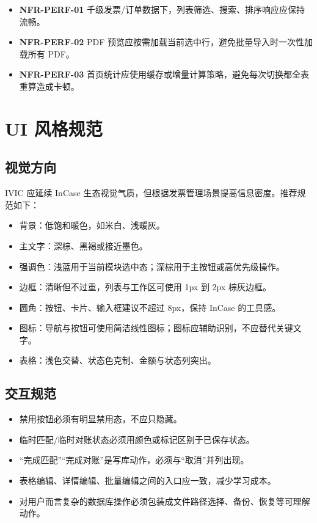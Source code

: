 \documentclass[UTF8,zihao=-4]{ctexart}
\newcommand{\req}[1]{\textbf{\textcolor{ivicBrown}{#1}}}
\begin{document}
\begin{itemize}
  \item \req{NFR-PERF-01} 千级发票/订单数据下，列表筛选、搜索、排序响应应保持流畅。
  \item \req{NFR-PERF-02} PDF 预览应按需加载当前选中行，避免批量导入时一次性加载所有 PDF。
  \item \req{NFR-PERF-03} 首页统计应使用缓存或增量计算策略，避免每次切换都全表重算造成卡顿。
\end{itemize}

\section{UI 风格规范}

\subsection{视觉方向}

IVIC 应延续 InCase 生态视觉气质，但根据发票管理场景提高信息密度。推荐规范如下：

\begin{itemize}
  \item 背景：低饱和暖色，如米白、浅暖灰。
  \item 主文字：深棕、黑褐或接近墨色。
  \item 强调色：浅蓝用于当前模块选中态；深棕用于主按钮或高优先级操作。
  \item 边框：清晰但不过重，列表与工作区可使用 1px 到 2px 棕灰边框。
  \item 圆角：按钮、卡片、输入框建议不超过 8px，保持 InCase 的工具感。
  \item 图标：导航与按钮可使用简洁线性图标；图标应辅助识别，不应替代关键文字。
  \item 表格：浅色交替、状态色克制、金额与状态列突出。
\end{itemize}

\subsection{交互规范}

\begin{itemize}
  \item 禁用按钮必须有明显禁用态，不应只隐藏。
  \item 临时匹配/临时对账状态必须用颜色或标记区别于已保存状态。
  \item “完成匹配”“完成对账”是写库动作，必须与“取消”并列出现。
  \item 表格编辑、详情编辑、批量编辑之间的入口应一致，减少学习成本。
  \item 对用户而言复杂的数据库操作必须包装成文件路径选择、备份、恢复等可理解动作。
\end{itemize}
\end{document}
